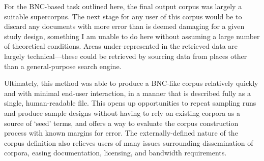 For the BNC-based task outlined here, the final output corpus was largely a suitable supercorpus.  The next stage for any user of this corpus would be to discard any documents with more error than is deemed damaging for a given study design, something I am unable to do here without assuming a large number of theoretical conditions.  Areas under-represented in the retrieved data are largely technical---these could be retrieved by sourcing data from places other than a general-purpose search engine.  %

Ultimately, this method was able to produce a BNC-like corpus relatively quickly and with minimal end-user interaction, in a manner that is described fully as a single, human-readable file.  This opens up opportunities to repeat sampling runs and produce sample designs without having to rely on existing corpora as a source of `seed' terms, and offers a way to evaluate the corpus construction process with known margins for error.  The externally-defined nature of the corpus definition also relieves users of many issues surrounding dissemination of corpora, easing documentation, licensing, and bandwidth requirements.







